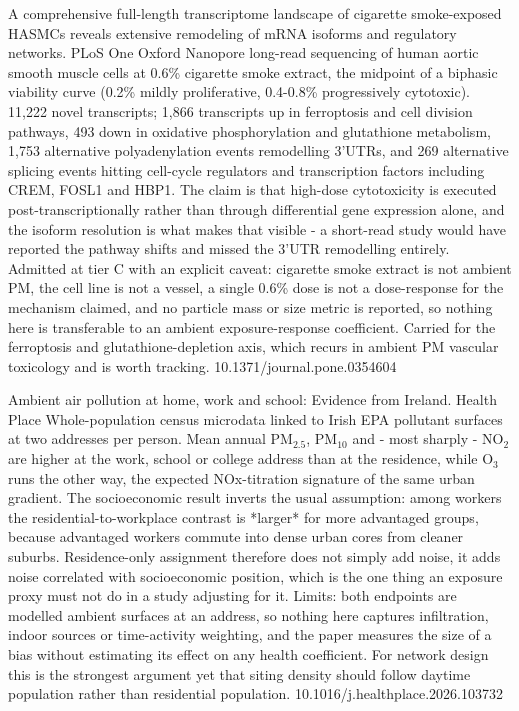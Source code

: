 \documentclass[10pt]{article}
\begin{document}

{A comprehensive full-length transcriptome landscape of cigarette smoke-exposed HASMCs reveals extensive remodeling of mRNA isoforms and regulatory networks.}
{PLoS One}
{Oxford Nanopore long-read sequencing of human aortic smooth muscle cells at 0.6\% cigarette smoke extract, the midpoint of a biphasic viability curve (0.2\% mildly proliferative, 0.4-0.8\% progressively cytotoxic). 11,222 novel transcripts; 1,866 transcripts up in ferroptosis and cell division pathways, 493 down in oxidative phosphorylation and glutathione metabolism, 1,753 alternative polyadenylation events remodelling 3'UTRs, and 269 alternative splicing events hitting cell-cycle regulators and transcription factors including CREM, FOSL1 and HBP1. The claim is that high-dose cytotoxicity is executed post-transcriptionally rather than through differential gene expression alone, and the isoform resolution is what makes that visible - a short-read study would have reported the pathway shifts and missed the 3'UTR remodelling entirely. Admitted at tier C with an explicit caveat: cigarette smoke extract is not ambient PM, the cell line is not a vessel, a single 0.6\% dose is not a dose-response for the mechanism claimed, and no particle mass or size metric is reported, so nothing here is transferable to an ambient exposure-response coefficient. Carried for the ferroptosis and glutathione-depletion axis, which recurs in ambient PM vascular toxicology and is worth tracking.}
{10.1371/journal.pone.0354604}


{Ambient air pollution at home, work and school: Evidence from Ireland.}
{Health Place}
{Whole-population census microdata linked to Irish EPA pollutant surfaces at two addresses per person. Mean annual PM$_{2.5}$, PM$_{10}$ and - most sharply - NO$_2$ are higher at the work, school or college address than at the residence, while O$_3$ runs the other way, the expected NOx-titration signature of the same urban gradient. The socioeconomic result inverts the usual assumption: among workers the residential-to-workplace contrast is *larger* for more advantaged groups, because advantaged workers commute into dense urban cores from cleaner suburbs. Residence-only assignment therefore does not simply add noise, it adds noise correlated with socioeconomic position, which is the one thing an exposure proxy must not do in a study adjusting for it. Limits: both endpoints are modelled ambient surfaces at an address, so nothing here captures infiltration, indoor sources or time-activity weighting, and the paper measures the size of a bias without estimating its effect on any health coefficient. For network design this is the strongest argument yet that siting density should follow daytime population rather than residential population.}
{10.1016/j.healthplace.2026.103732}
\end{document}
